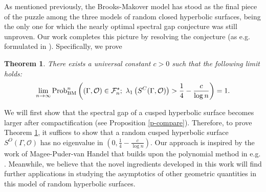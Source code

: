 \documentclass{amsart}
\theoremstyle{plain}
\newtheorem{theorem}{Theorem}[section]
\theoremstyle{definition}
\theoremstyle{remark}
\begin{document}
As mentioned previously, the Brooks-Makover model has stood as the final piece of the puzzle among the three models of random closed hyperbolic surfaces, being the only one for which the nearly optimal spectral gap conjecture was still unproven. Our work completes this picture by resolving the conjecture (as e.g. formulated in \cite[Page 71]{Petri-er}). Specifically, we prove

\begin{theorem}\label{mt-1}
   There exists a universal constant $c>0$ such that the following limit holds:
\[
\lim\limits_{n\to\infty}\textnormal{Prob}_{\textnormal{BM}}^n\left((\Gamma,\mathcal{O})\in\mathcal{F}_n^\star; \ \lambda_1\left(S^C(\Gamma,\mathcal{O})\right)>\frac{1}{4}-\frac{c}{\log n}\right)=1.
\]
\end{theorem}
\noindent We will first show that the spectral gap of a cusped hyperbolic surface becomes larger after compactification (see Proposition \ref{p-compare}). Therefore, to prove Theorem \ref{mt-1}, it suffices to show that a random cusped hyperbolic surface $S^O(\Gamma,\mathcal{O})$ has no eigenvalue in $\left(0,\frac{1}{4}-\frac{c}{\log n}\right)$. Our approach is inspired by the work \cite{MPvH25} of Magee-Puder-van Handel that builds upon the polynomial method in e.g. \cite{CGVTvH24, CGVvH24, MdlS24}. Meanwhile, we believe that the novel ingredients developed in this work will find further applications in studying the asymptotics of other geometric quantities in this model of random hyperbolic surfaces.
\\
\end{document}
